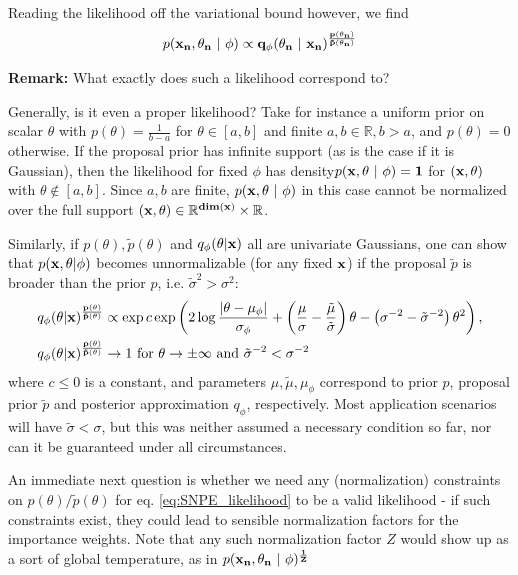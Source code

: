 \documentclass[10pt,english]{article}
\begin{document}
Reading the likelihood off the variational bound however, we find
\begin{align}
p( \bf{x}_n, \theta_n \ | \ \phi) \propto q_\phi(\theta_n \ | \ \bf{x}_n)^\frac{p(\theta_n)}{\tilde{p}(\theta_n)}
\label{eq:SNPE_likelihood}
\end{align}

\begin{framed}
\noindent{}\textbf{Remark:} What exactly does such a likelihood correspond to? 

Generally, is it even a proper likelihood? 
Take for instance a uniform prior on scalar $\theta$ with $p(\theta) = \frac{1}{b-a}$ for $\theta \in [a,b]$ and finite $a,b\in\mathbb{R}, b>a$, and $p(\theta) = 0$ otherwise. 
If the proposal prior has infinite support (as is the case if it is Gaussian), then the likelihood for fixed $\phi$ has density$p(\bf{x}, \theta \ | \ \phi) = 1$
for $(\bf{x}, \theta)$ with $\theta \notin [a,b]$.
Since $a,b$ are finite, $p(\bf{x}, \theta \ | \ \phi)$ in this case cannot be normalized over the full support $(\bf{x}, \theta) \in \mathbb{R}^{dim(\bf{x})} \times \mathbb{R}$. 

Similarly, if $p(\theta), \tilde{p}(\theta)$ and $q_\phi(\theta|\bf{x})$ all are univariate Gaussians, one can show that $p(\bf{x},\theta | \phi)$ becomes unnormalizable (for any fixed $\bf{x}$) if the proposal $\tilde{p}$ is broader than the prior $p$, i.e. $\tilde{\sigma}^2 > \sigma^2$:
\begin{align}
q_\phi(\theta | \bf{x})^\frac{p(\theta)}{\tilde{p}(\theta)} &\propto \exp c \exp \left( 2 \log \frac{|\theta - \mu_{\phi}|}{\sigma_{\phi}} + \left(\frac{\mu}{\sigma} - \frac{\tilde{\mu}}{\tilde{\sigma}}\right) \theta - \left(\sigma^{-2} - \tilde{\sigma}^{-2} \right) \theta^2 \right) \nonumber, \\
q_\phi(\theta | \bf{x})^\frac{p(\theta)}{\tilde{p}(\theta)} &\rightarrow 1 \mbox{ for } \theta \rightarrow \pm \infty \nonumber \mbox{ and } \tilde{\sigma}^{-2} < \sigma^{-2}
\end{align}
where $c \leq 0$ is a constant, and parameters $\mu, \tilde{\mu}, \mu_\phi$ correspond to prior $p$, proposal prior $\tilde{p}$ and posterior approximation $q_\phi$, respectively.
Most application scenarios will have $\tilde{\sigma} < \sigma$, but this was neither assumed a necessary condition so far, nor can it be guaranteed under all circumstances. 

An immediate next question is whether we need any (normalization) constraints on $p(\theta)/\tilde{p}(\theta)$ for eq. \ref{eq:SNPE_likelihood} to be a valid likelihood - if such constraints exist, they could lead to sensible normalization factors for the importance weights. 
Note that any such normalization factor $Z$ would show up as a sort of global temperature, as in $p( \bf{x}_n, \theta_n \ | \ \phi)^{\frac{1}{Z}}$
\end{framed}
\end{document}
